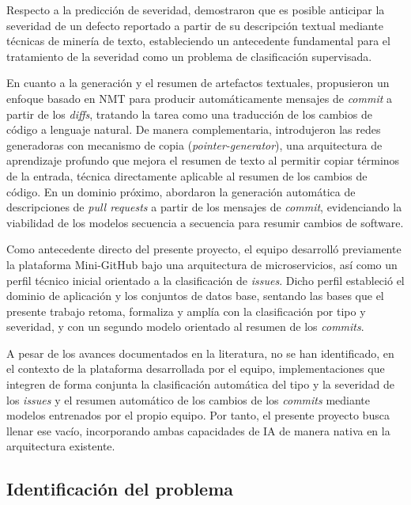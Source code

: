 Respecto a la predicción de severidad, \cite{Lamkanfi2010} demostraron que es posible anticipar la severidad de un defecto reportado a partir de su descripción textual mediante técnicas de minería de texto, estableciendo un antecedente fundamental para el tratamiento de la severidad como un problema de clasificación supervisada.

En cuanto a la generación y el resumen de artefactos textuales, \cite{Jiang2017} propusieron un enfoque basado en \acrfull{NMT} para producir automáticamente mensajes de \textit{commit} a partir de los \textit{diffs}, tratando la tarea como una traducción de los cambios de código a lenguaje natural. De manera complementaria, \cite{See2017} introdujeron las redes generadoras con mecanismo de copia (\textit{pointer-generator}), una arquitectura de aprendizaje profundo que mejora el resumen de texto al permitir copiar términos de la entrada, técnica directamente aplicable al resumen de los cambios de código. En un dominio próximo, \cite{Liu2019} abordaron la generación automática de descripciones de \textit{pull requests} a partir de los mensajes de \textit{commit}, evidenciando la viabilidad de los modelos secuencia a secuencia para resumir cambios de software.

Como antecedente directo del presente proyecto, el equipo desarrolló previamente la plataforma Mini-GitHub bajo una arquitectura de microservicios, así como un perfil técnico inicial orientado a la clasificación de \textit{issues}. Dicho perfil estableció el dominio de aplicación y los conjuntos de datos base, sentando las bases que el presente trabajo retoma, formaliza y amplía con la clasificación por tipo y severidad, y con un segundo modelo orientado al resumen de los \textit{commits}.

A pesar de los avances documentados en la literatura, no se han identificado, en el contexto de la plataforma desarrollada por el equipo, implementaciones que integren de forma conjunta la clasificación automática del tipo y la severidad de los \textit{issues} y el resumen automático de los cambios de los \textit{commits} mediante modelos entrenados por el propio equipo. Por tanto, el presente proyecto busca llenar ese vacío, incorporando ambas capacidades de \acrshort{IA} de manera nativa en la arquitectura existente.


\subsection{Identificación del problema}


